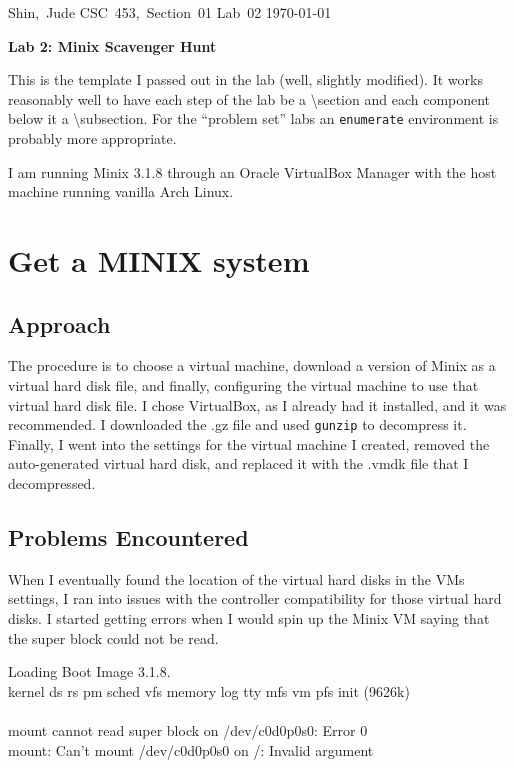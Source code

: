 \documentclass[11pt]{article}
\begin{document}
\hfill\vbox{\hbox{Shin, Jude}
		\hbox{CSC 453, Section 01}	
		\hbox{Lab 02}	
		\hbox{\today}}\par

\bigskip
\centerline{\Large\bf Lab 2: {\sc Minix} Scavenger Hunt}\par
\bigskip

This is the template I passed out in the lab (well, slightly 
modified).  It works reasonably well to have each step of the
lab be a {\textbackslash section} and each component below it
a {\textbackslash subsection}.  For the ``problem set'' labs
an {\tt enumerate} environment is probably more appropriate.

I am running {\sc Minix 3.1.8} through an {\sc Oracle VirtualBox Manager} with the host machine running vanilla {\sc Arch Linux}.

\setcounter{section}{0}
\section{Get a MINIX system}
\subsection{Approach}
The procedure is to choose a virtual machine, download a version of {\sc Minix} as a virtual hard disk file, and finally, configuring the virtual machine to use that virtual hard disk file. I chose {\sc VirtualBox}, as I already had it installed, and it was recommended. I downloaded the .gz file and used {\tt gunzip} to decompress it. Finally, I went into the settings for the virtual machine I created, removed the auto-generated virtual hard disk, and replaced it with the .vmdk file that I decompressed. 

\subsection{Problems Encountered}
When I eventually found the location of the virtual hard disks in the VMs settings, I ran into issues with the controller compatibility for those virtual hard disks. I started getting errors when I would spin up the {\sc Minix} VM saying that the super block could not be read. 

{\tt\begin{tabbing}
Loading Boot Image 3.1.8.\\
kernel ds rs pm sched vfs memory log tty mfs vm pfs init (9626k)\\
\\
mount cannot read super block on /dev/c0d0p0s0: Error 0\\
mount: Can't mount /dev/c0d0p0s0 on /: Invalid argument\\
\end{tabbing}}
\end{document}
